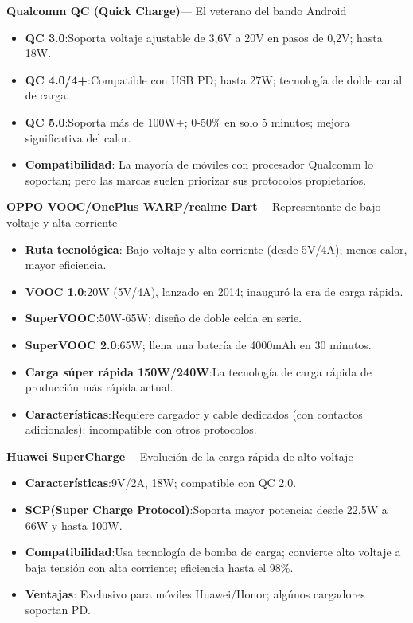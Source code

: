 \textbf{Qualcomm QC (Quick Charge)}— El veterano del bando Android

\begin{itemize}
  \item \textbf{QC 3.0}:Soporta voltaje ajustable de 3,6V a 20V en pasos de 0,2V; hasta 18W.
  \item \textbf{QC 4.0/4+}:Compatible con USB PD; hasta 27W; tecnología de doble canal de carga.
  \item \textbf{QC 5.0}:Soporta más de 100W+; 0-50\% en solo 5 minutos; mejora significativa del calor.
  \item \textbf{Compatibilidad}: La mayoría de móviles con procesador Qualcomm lo soportan; pero las marcas suelen priorizar sus protocolos propietaríos.
\end{itemize}

\textbf{OPPO VOOC/OnePlus WARP/realme Dart}— Representante de bajo voltaje y alta corriente

\begin{itemize}
  \item \textbf{Ruta tecnológica}: Bajo voltaje y alta corriente (desde 5V/4A); menos calor, mayor eficiencia.
  \item \textbf{VOOC 1.0}:20W (5V/4A), lanzado en 2014; inauguró la era de carga rápida.
  \item \textbf{SuperVOOC}:50W-65W; diseño de doble celda en serie.
  \item \textbf{SuperVOOC 2.0}:65W; llena una batería de 4000mAh en 30 minutos.
  \item \textbf{Carga súper rápida 150W/240W}:La tecnología de carga rápida de producción más rápida actual.
  \item \textbf{Características}:Requiere cargador y cable dedicados (con contactos adicionales); incompatible con otros protocolos.
\end{itemize}

\textbf{Huawei SuperCharge}— Evolución de la carga rápida de alto voltaje

\begin{itemize}
  \item \textbf{Características}:9V/2A, 18W; compatible con QC 2.0.
  \item \textbf{SCP(Super Charge Protocol)}:Soporta mayor potencia: desde 22,5W a 66W y hasta 100W.
  \item \textbf{Compatibilidad}:Usa tecnología de bomba de carga; convierte alto voltaje a baja tensión con alta corriente; eficiencia hasta el 98\%.
  \item \textbf{Ventajas}: Exclusivo para móviles Huawei/Honor; algúnos cargadores soportan PD.
\end{itemize}

